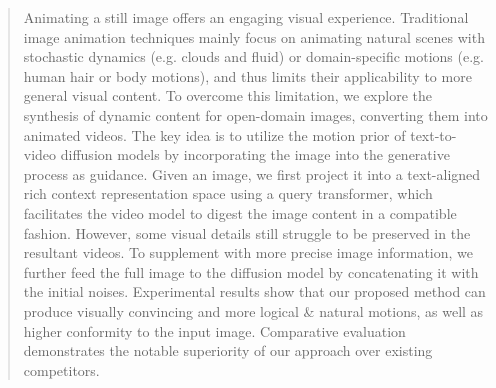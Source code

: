 \begin{abstract}
Animating a still image offers an engaging visual experience. Traditional image animation techniques mainly focus on animating natural scenes with stochastic dynamics (e.g. clouds and fluid) or domain-specific motions (e.g. human hair or body motions), and thus limits their applicability to more general visual content. To overcome this limitation, we explore the synthesis of dynamic content for open-domain images, converting them into animated videos. The key idea is to utilize the motion prior of text-to-video diffusion models by incorporating the image into the generative process as guidance.
Given an image, we first project it into a text-aligned rich context representation space using a query transformer, which facilitates the video model to digest the image content in a compatible fashion. However, some visual details still struggle to be preserved in the resultant videos. To supplement with more precise image information, we further feed the full image to the diffusion model by concatenating it with the initial noises.
Experimental results show that our proposed method can produce visually convincing and more logical \& natural motions, as well as higher conformity to the input image. Comparative evaluation demonstrates the notable superiority of our approach over existing competitors.
\end{abstract}